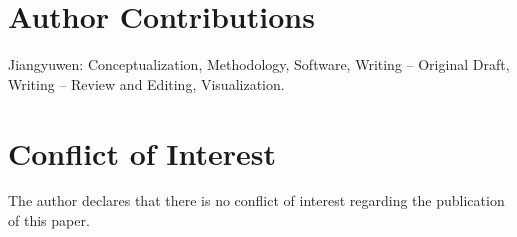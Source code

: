 \documentclass[12pt,a4paper]{article}
\theoremstyle{definition}
\begin{document}
\section*{Author Contributions}
\indent Jiangyuwen: Conceptualization, Methodology, Software, Writing -- Original Draft, Writing -- Review and Editing, Visualization.

\section*{Conflict of Interest}
\indent The author declares that there is no conflict of interest regarding the publication of this paper.
\end{document}

